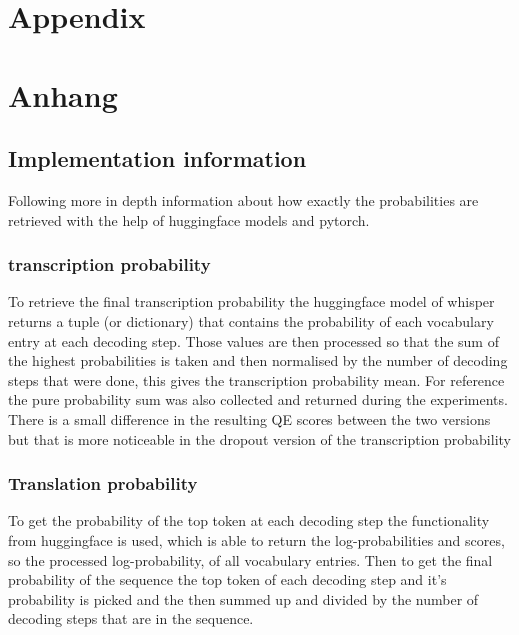 
{\chapter{Appendix}}    %
{\chapter{Anhang}}      %
\label{chap:appendix}
\section{Implementation information}\label{ch:implementation information}
Following more in depth information about how exactly the probabilities are retrieved with the help of huggingface models and pytorch. 
\subsection{transcription probability}
To retrieve the final transcription probability the huggingface model of whisper returns a tuple (or dictionary) that contains the probability of each vocabulary entry at each decoding step.
Those values are then processed so that the sum of the highest probabilities is taken and then normalised by the number of decoding steps that were done, this gives the transcription probability mean. For reference the pure probability sum was also collected and returned during the experiments. 
There is a small difference in the resulting QE scores between the two versions but that is more noticeable in the dropout version of the transcription probability 

\subsection{Translation probability}
To get the probability of the top token at each decoding step the functionality from huggingface is used, which is able to return the log-probabilities and scores, so the processed log-probability, of all vocabulary entries. 
Then to get the final probability of the sequence the top token of each decoding step and it's probability is picked and the then summed up and divided by the number of decoding steps that are in the sequence.

